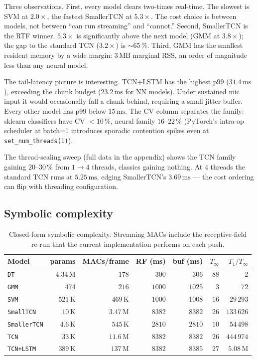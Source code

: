 Three observations.
First, every model clears two-times real-time.
The slowest is SVM at $2.0\times$, the fastest SmallerTCN at $5.3\times$.
The cost choice is between models, not between ``can run streaming'' and ``cannot.''
Second, SmallerTCN is the RTF winner.
$5.3\times$ is significantly above the next model (GMM at $3.8\times$); the gap to the standard TCN ($3.2\times$) is $\sim 65\,\%$.
Third, GMM has the smallest resident memory by a wide margin: $3\,\text{MB}$ marginal RSS, an order of magnitude less than any neural model.

The tail-latency picture is interesting.
TCN+LSTM has the highest p99 ($31.4\,\text{ms}$), exceeding the chunk budget ($23.2\,\text{ms}$ for NN models).
Under sustained mic input it would occasionally fall a chunk behind, requiring a small jitter buffer.
Every other model has p99 below $15\,\text{ms}$.
The CV column separates the family: sklearn classifiers have CV $< 10\,\%$, neural family $16$--$22\,\%$ (PyTorch's intra-op scheduler at batch=1 introduces sporadic contention spikes even at \texttt{set\_num\_threads(1)}).

The thread-scaling sweep (full data in the appendix) shows the TCN family gaining $20$--$30\,\%$ from $1 \to 4$ threads, classics gaining nothing.
At $4$ threads the standard TCN runs at $5.25\,\text{ms}$, edging SmallerTCN's $3.69\,\text{ms}$ — the cost ordering can flip with threading configuration.

\subsection{Symbolic complexity}
\label{sec:exp_complexity_symbolic_results}

\begin{table}[h]
\centering
\small
\begin{tabular}{lrrrrrr}
\toprule
\textbf{Model} & \textbf{params} & \textbf{MACs/frame} & \textbf{RF (ms)} & \textbf{buf (ms)} & \textbf{$T_\infty$} & \textbf{$T_1 / T_\infty$} \\
\midrule
\texttt{DT}         & $4.34$\,M & $178$    & $300$  & $306$ & $88$ & $2$ \\
\texttt{GMM}        & $474$     & $216$    & $1000$ & $1025$ & $3$ & $72$ \\
\texttt{SVM}        & $521$\,K  & $469$\,K & $1000$ & $1008$ & $16$ & $29\,293$ \\
\texttt{SmallTCN}   & $10$\,K   & $3.47$\,M & $8382$ & $8382$ & $26$ & $133\,626$ \\
\texttt{SmallerTCN} & $4.6$\,K  & $545$\,K  & $2810$ & $2810$ & $10$ & $54\,498$ \\
\texttt{TCN}        & $33$\,K   & $11.6$\,M & $8382$ & $8382$ & $26$ & $444\,974$ \\
\texttt{TCN+LSTM}   & $389$\,K  & $137$\,M  & $8382$ & $8385$ & $27$ & $5.08$\,M \\
\bottomrule
\end{tabular}
\caption{Closed-form symbolic complexity. Streaming MACs include the receptive-field re-run that the current implementation performs on each push.}
\label{tab:complexity_symbolic}
\end{table}

